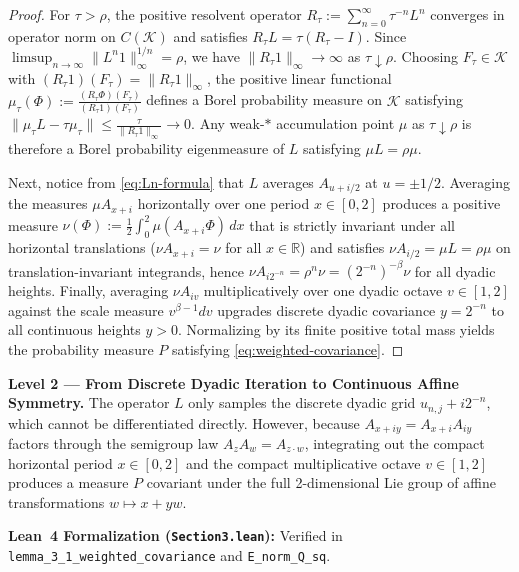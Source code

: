 \documentclass[12pt]{article}
\def\R{\mathbb{R}}
\def\K{\mathcal{K}}
\theoremstyle{definition}
\numberwithin{equation}{section}
\begin{document}
\begin{proof}
For $\tau > \rho$, the positive resolvent operator $R_\tau := \sum_{n=0}^{\infty} \tau^{-n} L^n$ converges in operator norm on $C(\K)$ and satisfies $R_\tau L = \tau(R_\tau - I)$. Since $\limsup_{n\to\infty} \|L^n 1\|_\infty^{1/n} = \rho$, we have $\|R_\tau 1\|_\infty \to \infty$ as $\tau \downarrow \rho$. Choosing $F_\tau \in \K$ with $(R_\tau 1)(F_\tau) = \|R_\tau 1\|_\infty$, the positive linear functional $\mu_\tau(\Phi) := \frac{(R_\tau \Phi)(F_\tau)}{(R_\tau 1)(F_\tau)}$ defines a Borel probability measure on $\K$ satisfying $\|\mu_\tau L - \tau \mu_\tau\| \le \frac{\tau}{\|R_\tau 1\|_\infty} \to 0$. Any weak-$*$ accumulation point $\mu$ as $\tau \downarrow \rho$ is therefore a Borel probability eigenmeasure of $L$ satisfying $\mu L = \rho \mu$.

Next, notice from \eqref{eq:Ln-formula} that $L$ averages $A_{u + i/2}$ at $u = \pm 1/2$. Averaging the measures $\mu A_{x+i}$ horizontally over one period $x \in [0, 2]$ produces a positive measure $\nu(\Phi) := \frac{1}{2}\int_0^2 \mu(A_{x+i}\Phi)\, dx$ that is strictly invariant under all horizontal translations ($\nu A_{x+i} = \nu$ for all $x \in \R$) and satisfies $\nu A_{i/2} = \mu L = \rho \mu$ on translation-invariant integrands, hence $\nu A_{i 2^{-n}} = \rho^n \nu = (2^{-n})^{-\beta}\nu$ for all dyadic heights. Finally, averaging $\nu A_{iv}$ multiplicatively over one dyadic octave $v \in [1, 2]$ against the scale measure $v^{\beta - 1} dv$ upgrades discrete dyadic covariance $y = 2^{-n}$ to all continuous heights $y > 0$. Normalizing by its finite positive total mass yields the probability measure $P$ satisfying \eqref{eq:weighted-covariance}.
\end{proof}

\begin{leveltwo}
\noindent\textbf{\textcolor{l2border}{Level 2 --- From Discrete Dyadic Iteration to Continuous Affine Symmetry.}}
The operator $L$ only samples the discrete dyadic grid $u_{n, j} + i 2^{-n}$, which cannot be differentiated directly. However, because $A_{x+iy} = A_{x+i} A_{iy}$ factors through the semigroup law $A_z A_w = A_{z\cdot w}$, integrating out the compact horizontal period $x \in [0, 2]$ and the compact multiplicative octave $v \in [1, 2]$ produces a measure $P$ covariant under the full 2-dimensional Lie group of affine transformations $w \mapsto x + yw$.

\smallskip
\noindent\textbf{\textcolor{leannote}{Lean~4 Formalization (\texttt{Section3.lean}):}} Verified in \texttt{lemma\_3\_1\_weighted\_covariance} and \texttt{E\_norm\_Q\_sq}.
\end{leveltwo}
\end{document}
